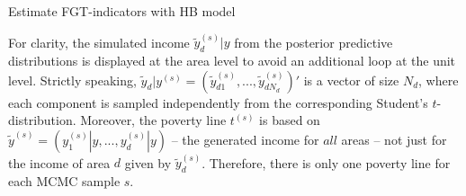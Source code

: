 \begin{algorithm}
    \caption{Estimate FGT-indicators with HB model}

\end{algorithm}


For clarity, the simulated income $\tilde y_d^{(s)}|y$ from the posterior predictive distributions is displayed at the area level to avoid an additional loop at the unit level.
Strictly speaking, $\tilde y_d|y^{(s)} = (\tilde y_{d1}^{(s)}, ..., \tilde y_{dN_d}^{(s)})'$ is a vector of size $N_d$, where each component is sampled independently from the corresponding Student's $t$-distribution.
Moreover, the poverty line $t^{(s)}$ is based on $\tilde y^{(s)} = (y^{(s)}_1|y, ..., y^{(s)}_d|y)$ – the generated income for $all$ areas – not just for the income of area $d$ given by $\tilde y_d^{(s)}$. Therefore, there is only one poverty line for each MCMC sample $s$.

